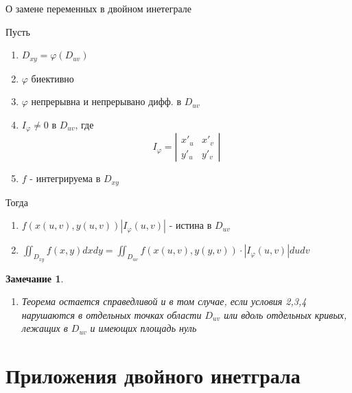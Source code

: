 \documentclass[a4paper, 14pt]{report}
\newtheorem{note}{Замечание}[section]
\begin{document}
\begin{theorem}
    О замене переменных в двойном инетеграле

    Пусть

    \begin{enumerate}
        \item $D_{xy} = \varphi(D_{uv})$
        \item $\varphi$ биективно
        \item $\varphi$ непрерывна и непрерывано дифф. в $D_{uv}$
        \item $I_\varphi \ne 0$ в $D_{uv}$, где 
            $$
                I_\varphi = \left| \begin{matrix} x'_u & x'_v \\ y'_u & y'_v \end{matrix} \right|
            $$
        \item $f$ - интегрируема в $D_{xy}$
    \end{enumerate}
    
    Тогда

    \begin{enumerate}
        \item $f(x(u,v), y(u,v)) |I_\varphi (u,v)|$ - истина в $D_{uv}$
        \item $\iint_{D_{xy}} f(x,y) dxdy = \iint_{D_{uv}} f(x(u,v), y(y,v)) \cdot |I_\varphi (u,v)| dudv$
    \end{enumerate}
\end{theorem}

\begin{note}
    \begin{enumerate}
        \item Теорема остается справедливой и в том случае, если условия 2,3,4 нарушаются в отдельных точках области $D_{uv}$ или вдоль отдельных кривых, лежащих в $D_{uv}$ и имеющих площадь нуль
    \end{enumerate}
\end{note}

\section{Приложения двойного инетграла}
\end{document}
